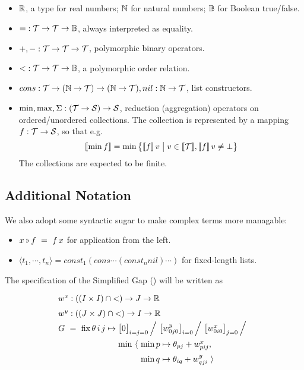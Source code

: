\begin{itemize}
  \item $\mathbb{R}$, a type for real numbers; $\mathbb{N}$ for natural numbers; $\mathbb{B}$ for Boolean true/false.
  \item ${=} : \mathcal{T}\to\mathcal{T}\to\mathbb{B}$, always interpreted as equality.
  \item ${+}, {-} : \mathcal{T}\to\mathcal{T}\to\mathcal{T}$, polymorphic binary operators.
  \item ${<} : \mathcal{T}\to\mathcal{T}\to\mathbb{B}$, a polymorphic order relation.
  \item $cons : \mathcal{T}\to(\mathbb{N}\to\mathcal{T})\to(\mathbb{N}\to\mathcal{T}), nil : \mathbb{N}\to\mathcal{T}$, list constructors.
  \item $\min, \max, \Sigma : (\mathcal{T}\to\mathcal{S})\to\mathcal{S}$, reduction (aggregation) operators
    on ordered/unordered collections. The collection is represented by a mapping $f : \mathcal{T}\to\mathcal{S}$,
    so that e.g. \[\semp{\min f} = \min \big\{\semp{f}\,v \;\big|\; v\in\semp{\T}, \semp{f}\,v\neq\bot\big\}\]
    The collections are expected to be finite.
\end{itemize}

\subsection{Additional Notation}
\newcommand\applt{\textrm{{\scriptsize\,}\guillemotright{\scriptsize\,}}}

We also adopt some syntactic sugar to make complex terms more managable:

\begin{itemize}
  \item $x \applt f ~=~ f\,x$ for application from the left.
  \item $\langle t_1,\cdots,t_n\rangle = cons t_1 (cons \cdots (cons t_n nil) \cdots)$
    for fixed-length lists.
\end{itemize}


\exampleTitle  \begin{comment}\subsection{Example}\end{comment}

\noindent
The specification of the Simplified Gap () will be written as
%
\begin{equation}
  \renewcommand\arraystretch{1.5}
  \begin{array}{@{}l@{}l@{}l@{}}
    \lspan3{\xw{} : ((I\times I)\cap{<})\to J\to\R} \\
    \lspan3{\yw{} : ((J\times J)\cap{<})\to I\to\R} \\
    G ~=~ \fix \theta\,i\,j\mapsto{}
      & \lspan2{\big[0\big]_{i=j=0} \,\Big/~ \big[\yw{0j0}\big]_{i=0} \,\Big/~ \big[\xw{0i0}\big]_{j=0} \,\Big/} \\
      & \min~\langle~ & \min p\mapsto\theta_{pj}+\xw{pij}, \\
      & & \min q\mapsto\theta_{iq}+\yw{qji} ~\rangle
  \end{array}
  \label{lang:arbiter spec}
\end{equation}

